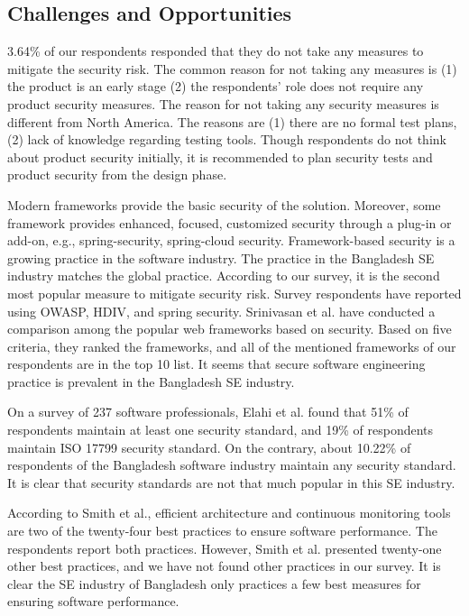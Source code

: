 \subsection{Challenges and Opportunities}
\label{dicussion challanges}
3.64\% of our respondents responded that they do not take any measures to mitigate the security risk. The common reason for not taking any measures is (1) the product is an early stage (2) the respondents' role does not require any product security measures. The reason for not taking any security measures is different from North America\citep{Assal2019}. The reasons are (1) there are no formal test plans, (2) lack of knowledge regarding testing tools. Though respondents do not think about product security initially, it is recommended\citep{Chandra2009,Azham2011} to plan security tests and product security from the design phase.

Modern frameworks provide the basic security of the solution. Moreover, some framework provides enhanced, focused, customized security through a plug-in or add-on, e.g., spring-security, spring-cloud security. Framework-based security is a growing practice in the software industry\citep{Alssir2012}. The practice in the Bangladesh SE industry matches the global practice. According to our survey, it is the second most popular measure to mitigate security risk. Survey respondents have reported using OWASP, HDIV, and spring security. Srinivasan et al.\citep{Srinivasan2017} have conducted a comparison among the popular web frameworks based on security. Based on five criteria, they ranked the frameworks, and all of the mentioned frameworks of our respondents are in the top 10 list. It seems that secure software engineering practice is prevalent in the Bangladesh SE industry.


On a survey of 237 software professionals, Elahi et al.\citep{Elahi2011} found that 51\% of respondents maintain at least one security standard, and 19\% of respondents maintain ISO 17799 security standard. On the contrary, about 10.22\% of respondents of the Bangladesh software industry maintain any security standard. It is clear that security standards are not that much popular in this SE industry.

According to Smith et al.\citep{Smith2003}, efficient architecture and continuous monitoring tools are two of the twenty-four best practices to ensure software performance. The respondents report both practices. However, Smith et al. presented twenty-one other best practices, and we have not found other practices in our survey. It is clear the SE industry of Bangladesh only practices a few best measures for ensuring software performance.

